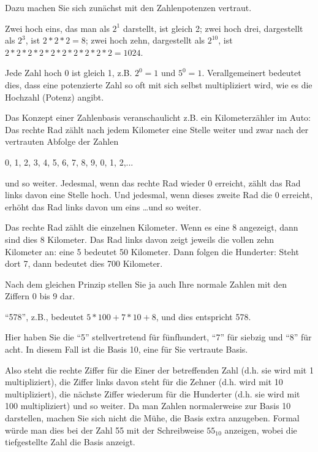 \documentclass[a4paper,11pt, oneside,openright,titlepage,dvips]{scrbook}
\newcommand{\IncludeImage}[2][]{\texorhtml{%
\texttt{[image: \#2]}%
}{%
\htmlimg{#2.png}%
}}
\begin{document}
Dazu machen Sie sich zunächst mit den Zahlenpotenzen vertraut.

Zwei hoch eins, das man als $2^1$ darstellt, ist gleich 2;
zwei hoch drei, dargestellt als $2^3$, ist $2 * 2 * 2 = 8$; zwei
hoch zehn, dargestellt als $2^{10}$, ist $2*2*2*2*2*2*2*2*2*2 = 1024$.

Jede Zahl hoch 0 ist gleich 1, z.B. $2^0 = 1$ und $5^0 = 1$.
Verallgemeinert bedeutet dies, dass eine potenzierte Zahl so oft mit
sich selbst multipliziert wird, wie es die Hochzahl (Potenz) angibt.

Das Konzept einer Zahlenbasis veranschaulicht z.B. ein
Kilometerzähler im Auto: Das rechte Rad zählt nach jedem
Kilometer eine Stelle weiter und zwar nach der vertrauten Abfolge
der Zahlen

0, 1, 2, 3, 4, 5, 6, 7, 8, 9, 0, 1, 2,...

und so weiter. Jedesmal, wenn das rechte Rad wieder 0 erreicht, zählt
das Rad links davon eine Stelle hoch. Und jedesmal, wenn dieses zweite
Rad die 0 erreicht, erhöht das Rad links davon um eins \ldots und so
weiter.


\begin{center}
\IncludeImage[width=0.4\textwidth]{mileage-indicator}
\end{center}

Das rechte Rad zählt die einzelnen Kilometer. Wenn es eine 8
angezeigt, dann sind dies 8 Kilometer. Das Rad links davon zeigt
jeweils die vollen zehn Kilometer an: eine 5 bedeutet 50 Kilometer.
Dann folgen die Hunderter: Steht dort 7, dann bedeutet dies 700
Kilometer.

Nach dem gleichen Prinzip stellen Sie ja auch Ihre normale Zahlen
mit den Ziffern 0 bis 9 dar.

"`578"', z.B., bedeutet $5 * 100 + 7 * 10 + 8$, und dies
entspricht 578.

Hier haben Sie die "`5"' stellvertretend für fünfhundert, "`7"' für
siebzig und "`8"' für acht. In diesem Fall ist die Basis 10, eine für
Sie vertraute Basis.

Also steht die rechte Ziffer für die Einer der betreffenden Zahl (d.h.
sie wird mit 1 multipliziert), die Ziffer links davon steht für die
Zehner (d.h. wird mit 10 multipliziert), die nächste Ziffer wiederum
für die Hunderter (d.h. sie wird mit 100 multipliziert) und so weiter.
Da man Zahlen normalerweise zur Basis 10 darstellen, machen Sie sich
nicht die Mühe, die Basis extra anzugeben. Formal würde man dies bei
der Zahl 55 mit der Schreibweise $55_{10}$ anzeigen, wobei die
tiefgestellte Zahl die Basis anzeigt.
\end{document}

